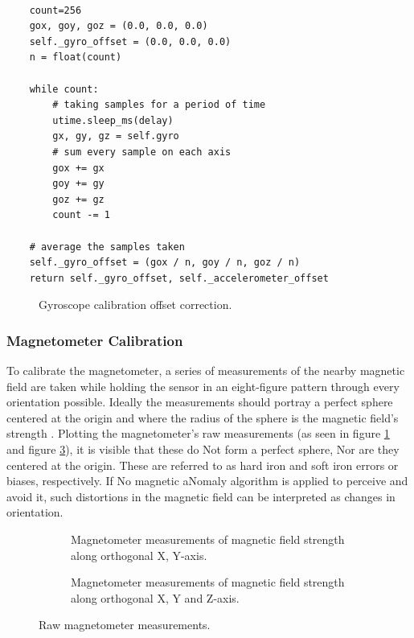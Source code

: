 \lstset{language=Python}

\begin{lstlisting}[frame=single]  % Start your code-block

    count=256
    gox, goy, goz = (0.0, 0.0, 0.0)
    self._gyro_offset = (0.0, 0.0, 0.0) 
    n = float(count)

    while count:
        # taking samples for a period of time
        utime.sleep_ms(delay)
        gx, gy, gz = self.gyro
        # sum every sample on each axis
        gox += gx
        goy += gy
        goz += gz
        count -= 1

    # average the samples taken
    self._gyro_offset = (gox / n, goy / n, goz / n)
    return self._gyro_offset, self._accelerometer_offset
\end{lstlisting}

\begin{figure}[!h]
  \centering
  \resizebox{0.8\linewidth}{!}{}
  \caption{Gyroscope calibration offset correction.}
\end{figure}

\subsubsection{Magnetometer Calibration}

To calibrate the magnetometer, a series of measurements of the nearby magnetic field are taken while holding the sensor in an eight-figure pattern through every orientation possible. Ideally the measurements should portray a perfect sphere centered at the origin and where the radius of the sphere is the magnetic field's strength \cite{kok2016magnetometer}. Plotting the magnetometer's raw measurements (as seen in figure \ref{plt:raw_magnetometer} and figure \ref{plt:raw_magnetometer3D}), it is visible that these do Not form a perfect sphere, Nor are they centered at the origin. These are referred to as hard iron and soft iron errors or biases, respectively. If No magnetic aNomaly algorithm is applied to perceive and avoid it, such distortions in the magnetic field can be interpreted as changes in orientation.

\begin{figure}[!h]
  \centering
  \begin{subfigure}{0.7\textwidth}
    \centering
    \resizebox{1\linewidth}{!}{}
    \caption{Magnetometer measurements of magnetic field strength along orthogonal X, Y-axis.}
    \label{plt:raw_magnetometer}
  \end{subfigure}

  \begin{subfigure}{0.7\textwidth}
    \centering
    \resizebox{1\linewidth}{!}{}
    \caption{Magnetometer measurements of magnetic field strength along orthogonal X, Y and Z-axis.}
    \label{plt:raw_magnetometer3D}
  \end{subfigure}
  \caption{Raw magnetometer measurements.}
\end{figure}

